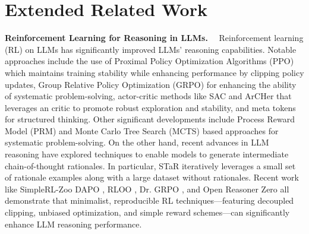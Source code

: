 \section{Extended Related Work}
\label{app:extendedrelatedwork}

\noindent\textbf{Reinforcement Learning for Reasoning in LLMs.}~~
Reinforcement learning (RL) on LLMs \citep{christiano2023deepreinforcementlearninghuman,ouyang2022traininglanguagemodelsfollow,chen2021decisiontransformer, havrilla2024teachinglargelanguagemodels} has significantly improved LLMs' reasoning capabilities. Notable approaches include the use of Proximal Policy Optimization Algorithms (PPO) \citep{schulman2017proximalpolicyoptimizationalgorithms} which maintains training stability while enhancing performance by clipping policy updates, Group Relative Policy Optimization (GRPO) \citep{deepseekai2025deepseekr1incentivizingreasoningcapability} for enhancing the ability of systematic problem-solving, actor-critic methods like SAC \citep{haarnoja2018softactorcritic} and ArCHer \citep{archer} that leverages an critic to promote robust exploration and stability, and meta tokens \citep{goyal2024thinkspeaktraininglanguage,herel2024thinkingtokenslanguagemodeling,pfau2024letsthinkdotdot} for structured thinking. Other significant developments include Process Reward Model (PRM) \citep{zhang2025lessonsdevelopingprocessreward, lightman2023verify} and Monte Carlo Tree Search (MCTS) based approaches \citep{hao2023reasoning} for systematic problem-solving. On the other hand, recent advances in LLM reasoning have explored techniques to enable models to generate intermediate chain-of-thought rationales. In particular, STaR \citep{Zelikman2022STaR} iteratively leverages a small set of rationale examples along with a large dataset without rationales. Recent work like SimpleRL-Zoo \citep{zeng2025simplerlzoo} DAPO \citep{yu2025DAPO}, RLOO \citep{rloo}, Dr. GRPO \citep{liu2025DRGRPO}, and Open Reasoner Zero \citep{hu2025openreasonerzero} all demonstrate that minimalist, reproducible RL techniques—featuring decoupled clipping, unbiased optimization, and simple reward schemes—can significantly enhance LLM reasoning performance. 

